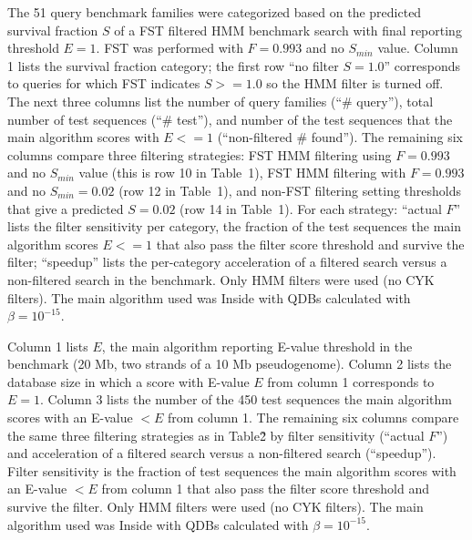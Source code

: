 \documentclass{bioinfo}
\begin{document}
\begin{table}[!t]
{} {The 51 query benchmark families were
  categorized based on the predicted survival fraction $S$ of a FST
  filtered HMM benchmark search with final reporting threshold
  $E=1$. FST was performed with $F=0.993$ and no $S_{min}$
  value. Column 1 lists the survival fraction category; the first row
  ``no filter $S=1.0$'' corresponds to queries for which FST indicates
  $S>=1.0$ so the HMM filter is turned off. The next three columns
  list the number of query families (``\# query''), total number of
  test sequences (``\# test''), and number of the test sequences that
  the main algorithm scores with $E<=1$ (``non-filtered \#
  found''). The remaining six columns compare three filtering
  strategies: FST HMM filtering using $F=0.993$ and no $S_{min}$ value
  (this is row 10 in Table~1), FST HMM filtering with $F=0.993$ and no
  $S_{min}=0.02$ (row 12 in Table~1), and non-FST filtering setting
  thresholds that give a predicted $S=0.02$ (row 14 in Table~1). For
  each strategy: ``actual $F$'' lists the filter sensitivity per
  category, the fraction of the test sequences the main algorithm
  scores $E<=1$ that also pass the filter score threshold and survive
  the filter; ``speedup'' lists the per-category acceleration of a
  filtered search versus a non-filtered search in the benchmark.  Only
  HMM filters were used (no CYK filters). The main algorithm used was
  Inside with QDBs calculated with $\beta=10^{-15}$.}
\end{table}

\begin{table}[!t]
{}
{Column 1 lists $E$, the main algorithm reporting E-value threshold in
  the benchmark (20 Mb, two strands of a 10 Mb pseudogenome).  Column
  2 lists the database size in which a score with E-value $E$ from
  column 1 corresponds to $E=1$. Column 3 lists the number of the 450
  test sequences the main algorithm scores with an E-value $<E$ from
  column 1.  The remaining six columns compare the same three
  filtering strategies as in Table\~2 by filter sensitivity (``actual
  $F$'') and acceleration of a filtered search versus a non-filtered
  search (``speedup'').  Filter sensitivity is the fraction of test
  sequences the main algorithm scores with an E-value $<E$ from column
  1 that also pass the filter score threshold and survive the filter.
  Only HMM filters were used (no CYK filters).  The main algorithm
  used was Inside with QDBs calculated with $\beta=10^{-15}$.}
\end{table}

%

\end{document}
